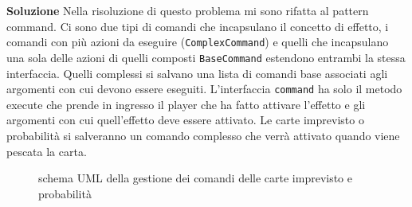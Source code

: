 \textbf{Soluzione}\newline
Nella risoluzione di questo problema mi sono rifatta al pattern command. Ci sono due tipi di comandi che incapsulano il concetto di effetto, i comandi con più azioni da eseguire (\texttt{ComplexCommand}) e quelli che incapsulano una sola delle azioni di quelli composti \texttt{BaseCommand} estendono entrambi la stessa interfaccia. Quelli complessi  si salvano una lista di comandi base associati agli argomenti con cui devono essere eseguiti. 
L’interfaccia \texttt{command} ha solo il metodo execute che prende in ingresso il player che ha fatto attivare l’effetto e gli argomenti con cui quell’effetto deve essere attivato. 
Le carte imprevisto o probabilità si salveranno un comando complesso che verrà attivato quando viene pescata la carta.
\begin{figure}[H]
    \centering
    \caption{schema UML della gestione dei comandi delle carte imprevisto e probabilità}
    \label{img:ArchitectureDiagram-Pagina-1}
\end{figure}

